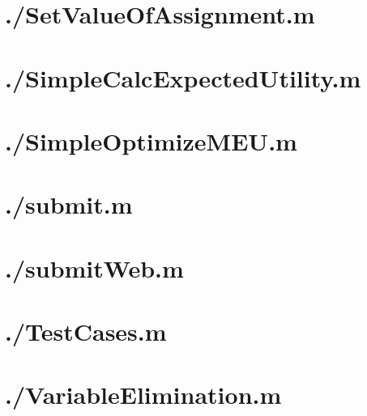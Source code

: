 \documentclass{article}
\begin{document}
\section{./SetValueOfAssignment.m}

\section{./SimpleCalcExpectedUtility.m}

\section{./SimpleOptimizeMEU.m}

\section{./submit.m}

\section{./submitWeb.m}

\section{./TestCases.m}

\section{./VariableElimination.m}

\end{document}
